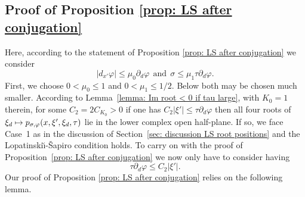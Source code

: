 \documentclass[10pt]{amsart}
\newcommand\mto{\mathchoice{\longmapsto}{\mapsto}{\mapsto}{\mapsto}}
\theoremstyle{plain}
\theoremstyle{definition}
\newcommand{\LS}{Lopatinski\u{\i}-\v{S}apiro\xspace}
\newcommand{\pconj}{p_{\sigma,\varphi}}
\begin{document}
\subsection{Proof of Proposition \ref{prop: LS after conjugation}}\label{rf1}

Here, according to the statement of Proposition \ref{prop: LS after
conjugation} we consider\vspace*{-3pt}
\begin{equation*}
|d_{x'}\varphi|\leq \mu_0 \partial_d \varphi
\ \ \text{and} \ \
\sigma \leq \mu_1 \tau \partial_d \varphi.
\end{equation*}
First, we choose $0 < \mu_0 \leq 1$ and $0< \mu_1 \leq 1/2$. Below both may be chosen much
smaller. According to Lemma~\ref{lemma: Im root < 0 if tau large},
with $K_0=1$ therein,
for some $C_2 = 2 C_{K_0}>0$ if one has $C_2|\xi'| \leq \tau \partial_d \varphi$
then all four roots of $\xi_d \mto \pconj(x,\xi',\xi_d
,\tau)$ lie in the lower complex open half-plane. If so,
we face Case~1 as in the discussion of Section~\ref{sec: discussion LS root
positions} and the \LS condition holds.
To carry on with the proof of Proposition~\ref{prop: LS after conjugation} we
now only have to consider having\vspace*{-3pt}
\begin{equation}
\label{eq: condition tau small}
\tau \partial_d \varphi \leq C_2 |\xi'|.
\end{equation}
Our proof of Proposition \ref{prop: LS after conjugation} relies on
the following lemma.
\end{document}
